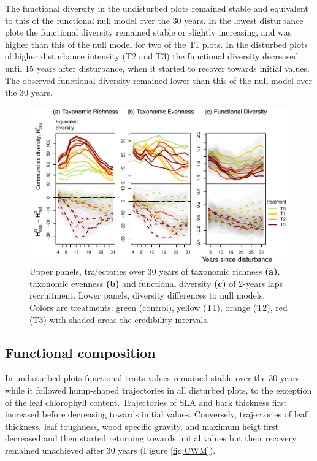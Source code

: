 \documentclass[fleqn,10pt]{ArtEcoFoG} %
\begin{document}
The functional diversity in the undisturbed plots remained stable and
equivalent to this of the functional null model over the 30 years. In
the lowest disturbance plots the functional diversity remained stable or
slightly increasing, and was higher than this of the null model for two
of the T1 plots. In the disturbed plots of higher disturbance intensity
(T2 and T3) the functional diversity decreased until 15 years after
disturbance, when it started to recover towards initial values. The
observed functional diversity remained lower than this of the null model
over the 30 years.

\begin{figure}

{\centering \includegraphics{RecruitmentTrajectories_files/figure-latex/DivTraj-1} 

}

\caption{Upper panels, trajectories over 30 years of taxonomic richness \textbf{(a)}, taxonomic evenness \textbf{(b)} and functional diversity \textbf{(c)} of 2-years laps recruitment. Lower panels, diversity differences to null models. Colors are treatments: green (control), yellow (T1), orange (T2), red (T3) with shaded areas the credibility intervals.}\label{fig:DivTraj}
\end{figure}

\subsection{Functional composition}\label{functional-composition}

In undisturbed plots functional traits values remained stable over the
30 years while it followed hump-shaped trajectories in all disturbed
plots, to the exception of the leaf chlorophyll content. Trajectories of
SLA and bark thickness first increased before decreasing towards initial
values. Conversely, trajectories of leaf thickness, leaf toughness, wood
specific gravity, and maximum heigt first decreased and then started
returning towards initial values but their recovery remained unachieved
after 30 years (Figure \ref{fig:CWM}).
\end{document}
